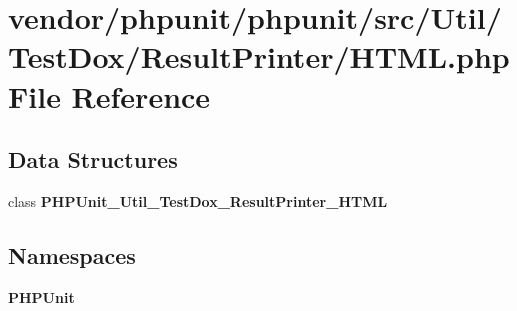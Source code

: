 \section{vendor/phpunit/phpunit/src/\+Util/\+Test\+Dox/\+Result\+Printer/\+H\+T\+M\+L.php File Reference}
\label{phpunit_2src_2_util_2_test_dox_2_result_printer_2_h_t_m_l_8php}
\subsection*{Data Structures}
\begin{DoxyCompactItemize}
\item 
class {\bf P\+H\+P\+Unit\+\_\+\+Util\+\_\+\+Test\+Dox\+\_\+\+Result\+Printer\+\_\+\+H\+T\+M\+L}
\end{DoxyCompactItemize}
\subsection*{Namespaces}
\begin{DoxyCompactItemize}
\item 
 {\bf P\+H\+P\+Unit}
\end{DoxyCompactItemize}
